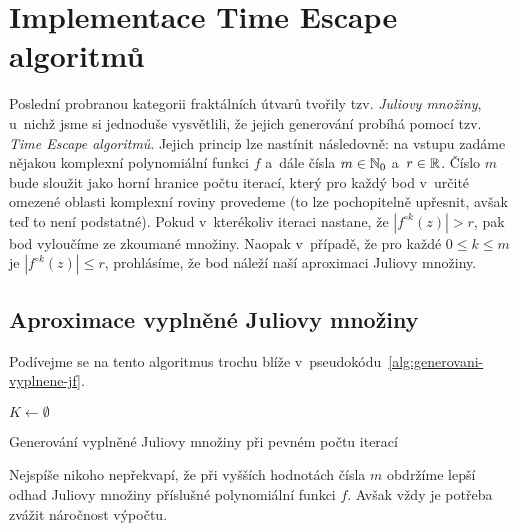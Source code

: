 \section{Implementace Time Escape algoritmů}\label{sec:implementace-tea}

Poslední probranou kategorii fraktálních útvarů tvořily tzv. \emph{Juliovy množiny}, u~nichž jsme si jednoduše vysvětlili, že jejich generování probíhá pomocí tzv. \emph{Time Escape algoritmů}. Jejich princip lze nastínit následovně: na vstupu zadáme nějakou komplexní polynomiální funkci $f$ a~dále čísla $m\in\mathbb{N}_0$ a~$r\in\mathbb{R}$. Číslo $m$ bude sloužit jako horní hranice počtu iterací, který pro každý bod v~určité omezené oblasti komplexní roviny provedeme (to lze pochopitelně upřesnit, avšak teď to není podstatné). Pokud v~kterékoliv iteraci nastane, že $|f^{\circ k}(z)|>r$, pak bod vyloučíme ze zkoumané množiny. Naopak v~případě, že pro každé $0\leqslant k\leqslant m$ je $|f^{\circ k}(z)|\leqslant r$, prohlásíme, že bod náleží naší aproximaci Juliovy množiny.

\subsection{Aproximace vyplněné Juliovy množiny}\label{subsec:aproximace-vyplnene-juliovy-mnoziny}

Podívejme se na tento algoritmus trochu blíže v~pseudokódu~\ref{alg:generovani-vyplnene-jf}.
\begin{algorithm}
    $K\gets\emptyset$\;
    \;
    \caption{Generování vyplněné Juliovy množiny při pevném počtu iterací}
    \label{alg:generovani-vyplnene-jf}
\end{algorithm}
Nejspíše nikoho nepřekvapí, že při vyšších hodnotách čísla $m$ obdržíme lepší odhad Juliovy množiny příslušné polynomiální funkci $f$. Avšak vždy je potřeba zvážit náročnost výpočtu.

